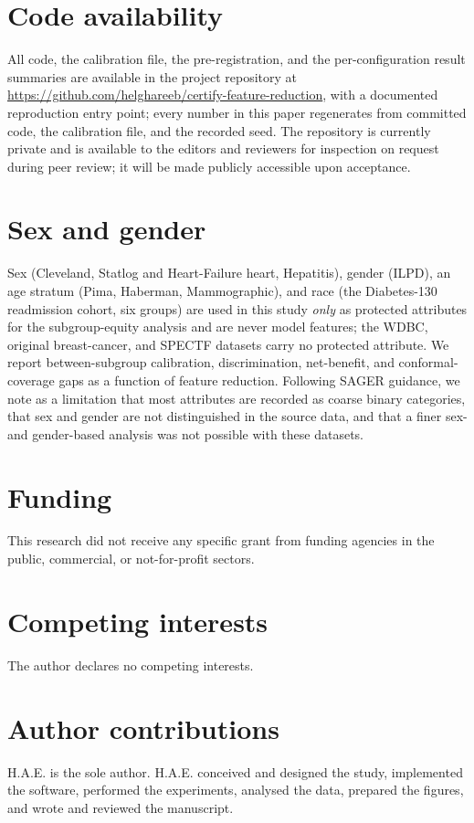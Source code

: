 \documentclass[fleqn,10pt]{wlscirep}
\begin{document}
\section*{Code availability}
All code, the calibration file, the pre-registration, and the per-configuration result summaries are
available in the project repository at \url{https://github.com/helghareeb/certify-feature-reduction}, with a documented reproduction entry point; every number in this paper regenerates from committed code, the
calibration file, and the recorded seed. The repository is currently private and is available to the
editors and reviewers for inspection on request during peer review; it will be made publicly accessible
upon acceptance.

\section*{Sex and gender}
Sex (Cleveland, Statlog and Heart-Failure heart, Hepatitis), gender (ILPD), an age stratum (Pima,
Haberman, Mammographic), and race (the Diabetes-130 readmission cohort, six groups) are used in this
study \emph{only} as protected attributes for the subgroup-equity analysis and are never model
features; the WDBC, original breast-cancer, and SPECTF datasets carry no protected attribute. We
report between-subgroup calibration, discrimination, net-benefit, and conformal-coverage gaps as a
function of feature reduction. Following SAGER guidance, we note as a limitation that most attributes
are recorded as coarse binary categories, that sex and gender are not distinguished in the source
data, and that a finer sex- and gender-based analysis was not possible with these datasets.

\section*{Funding}
This research did not receive any specific grant from funding agencies in the public, commercial, or
not-for-profit sectors.

\section*{Competing interests}
The author declares no competing interests.

\section*{Author contributions}
H.A.E. is the sole author. H.A.E. conceived and designed the study, implemented the software, performed
the experiments, analysed the data, prepared the figures, and wrote and reviewed the manuscript.
\end{document}

